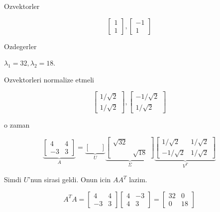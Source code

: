 \documentclass[12pt,fleqn]{article}\usepackage{../common}
\begin{document}
Ozvektorler

\[ 
\left[\begin{array}{r}
1 \\ 1
\end{array}\right],
\left[\begin{array}{r}
-1 \\ 1
\end{array}\right]
 \]

Ozdegerler

$\lambda_1=32, \lambda_2=18$. 

Ozvektorleri normalize etmeli

\[ 
\left[\begin{array}{r}
1 / \sqrt{ 2} \\ 1/ \sqrt{ 2}
\end{array}\right],
\left[\begin{array}{r}
-1/ \sqrt{ 2} \\ 1/ \sqrt{ 2}
\end{array}\right]
 \]

o zaman 

\[ 
\underbrace{
\left[\begin{array}{rr}
4 & 4 \\ -3 & 3
\end{array}\right] 
}_{A}
=
\underbrace{
\left[\begin{array}{rr}
 &  \\  & 
\end{array}\right]
}_{U}
\underbrace{
\left[\begin{array}{rr}
\sqrt{ 32} &  \\  & \sqrt{ 18}
\end{array}\right]
}_{\Sigma}
\underbrace{
\left[\begin{array}{rr}
1/\sqrt{ 2} & 1/\sqrt{ 2} \\ -1/\sqrt{ 2} & 1/\sqrt{ 2}
\end{array}\right]
}_{V^T}
 \]

Simdi $U$'nun sirasi geldi. Onun icin $AA^T$ lazim. 

\[ A^TA = 
\left[\begin{array}{rr}
4 & 4 \\ -3 & 3
\end{array}\right] 
\left[\begin{array}{rr}
4 & -3 \\ 4 & 3
\end{array}\right] =
\left[\begin{array}{rr}
32 & 0 \\ 0 & 18
\end{array}\right]
 \]
\end{document}
